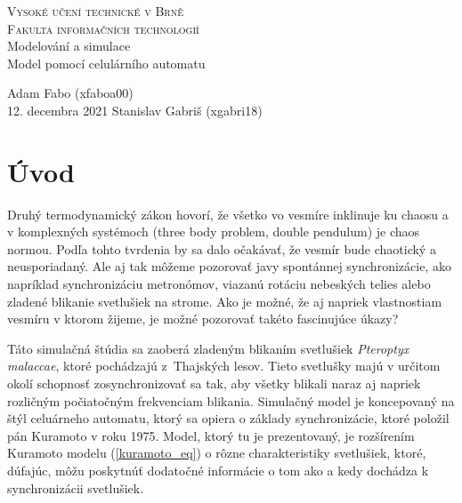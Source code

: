 \documentclass[a4paper, 11pt]{article}
\begin{document}
\begin{titlepage}
    \begin{center}
        {\Huge\textsc{Vysoké učení technické v Brně}}\\[0.4em]
        {\huge\textsc{Fakulta informačních technologií}}\\
        {\LARGE Modelování a simulace}\\[0.3em]
        {\Huge Model pomocí celulárního automatu}\\
    \end{center}
        {\Large \hfill
        Adam Fabo (xfaboa00) \\ 12. decembra 2021 \hfill Stanislav Gabriš (xgabri18)}
\end{titlepage}

\tableofcontents

\pagebreak 

\section{Úvod}


Druhý termodynamický zákon hovorí, že všetko vo vesmíre inklinuje ku chaosu\cite{Thermo} a v komplexných systémoch (three body problem, double pendulum) je chaos normou. Podľa tohto tvrdenia by sa dalo očakávať, že vesmír bude chaotický a neusporiadaný. Ale aj tak môžeme pozorovať javy spontánnej synchronizácie, ako napríklad synchronizáciu metronómov, viazanú rotáciu nebeských telies alebo zladené blikanie svetlušiek na strome.\cite{Svetlusky}\cite{Strogatz} Ako je možné, že aj napriek vlastnostiam vesmíru v ktorom žijeme, je možné pozorovať takéto fascinujúce úkazy? 


Táto simulačná štúdia sa zaoberá zladeným blikaním svetlušiek \textit{Pteroptyx malaccae}, ktoré pochádzajú z~Thajských lesov. Tieto svetlušky majú v určitom okolí schopnosť zosynchronizovať sa tak, aby všetky blikali naraz aj napriek rozličným počiatočným frekvenciam blikania. Simulačný model je koncepovaný na štýl celuárneho automatu, ktorý sa opiera o základy synchronizácie, ktoré položil pán Kuramoto v roku 1975\cite{Kuramoto2}. Model, ktorý tu je prezentovaný, je rozšírením Kuramoto modelu (\ref{kuramoto_eq}) o rôzne charakteristiky svetlušiek, ktoré, dúfajúc, môžu poskytnúť dodatočné informácie o tom ako a kedy dochádza k synchronizácii svetlušiek.
\end{document}
